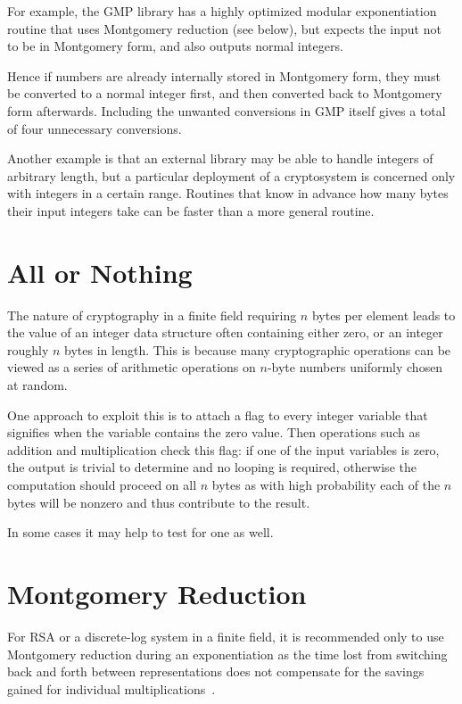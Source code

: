 For example, the GMP library has a highly optimized modular exponentiation
routine that uses Montgomery reduction (see below),
but expects the input not to be
in Montgomery form, and also outputs normal integers.

Hence if numbers are already internally stored in Montgomery form,
they must be converted to a normal integer first, and then converted
back to Montgomery form afterwards. Including the unwanted conversions in
GMP itself gives a total of four unnecessary conversions.

Another example is that an external library may be able to handle integers
of arbitrary length, but a particular deployment of a cryptosystem is
concerned only with integers in a certain range. Routines that know
in advance how many bytes their input integers take can be faster than
a more general routine.

\section{All or Nothing}

The nature of cryptography in a finite field requiring $n$ bytes per element
leads to the value of an integer data structure
often containing either zero, or an integer roughly $n$ bytes in length.
This is because many cryptographic operations can be viewed as a series of
arithmetic operations on $n$-byte numbers uniformly chosen at random.

One approach to exploit this is to attach a flag to every integer variable
that signifies when the variable contains the zero value. Then operations
such as addition and multiplication check this flag: if one of the input
variables is zero, the output is trivial to determine and no looping
is required, otherwise the computation should proceed on all $n$ bytes as
with high probability each of the $n$ bytes will be nonzero and thus
contribute to the result.

In some cases it may help to test for one as well.

\section{Montgomery Reduction}

For RSA or a discrete-log system in a finite field, it is recommended
only to use Montgomery reduction during an exponentiation
as the time lost from switching back and forth between representations
does not compensate for the savings gained for individual multiplications~\cite{handbook}.

